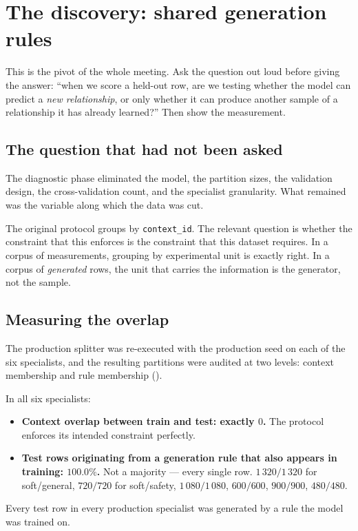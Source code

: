 \chapter{The discovery: shared generation rules}
\label{ch:discovery}

\begin{saybox}[title=What to say at the start of this section]
This is the pivot of the whole meeting. Ask the question out loud before
giving the answer: ``when we score a held-out row, are we testing whether
the model can predict a \emph{new relationship}, or only whether it can
produce another sample of a relationship it has already learned?'' Then
show the measurement.
\end{saybox}

\section{The question that had not been asked}

The diagnostic phase eliminated the model, the partition sizes, the
validation design, the cross-validation count, and the specialist
granularity. What remained was the variable along which the data was cut.

The original protocol groups by \texttt{context\_id}. The relevant question
is whether the constraint that this enforces is the constraint that this
dataset requires. In a corpus of measurements, grouping by experimental
unit is exactly right. In a corpus of \emph{generated} rows, the unit that
carries the information is the generator, not the sample.

\section{Measuring the overlap}

The production splitter was re-executed with the production seed on each
of the six specialists, and the resulting partitions were audited at two
levels: context membership and rule membership
().


\begin{findingbox}[title=The central measurement]
In all six specialists:
\begin{itemize}[leftmargin=1.2em, itemsep=1pt]
\item \textbf{Context overlap between train and test: exactly $0$.} The
  protocol enforces its intended constraint perfectly.
\item \textbf{Test rows originating from a generation rule that also
  appears in training: $100.0\%$.} Not a majority --- every single row.
  $1\,320/1\,320$ for soft/general, $720/720$ for soft/safety,
  $1\,080/1\,080$, $600/600$, $900/900$, $480/480$.
\end{itemize}

Every test row in every production specialist was generated by a rule the
model was trained on.
\end{findingbox}

